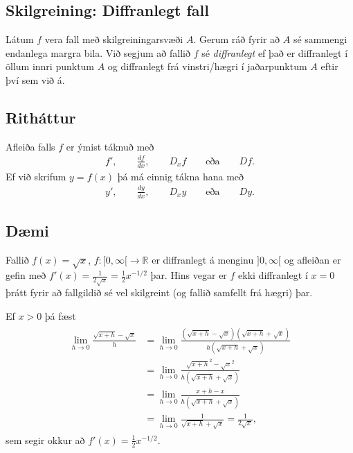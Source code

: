 \documentclass[b5paper,11pt,icelandic]{sphinxmanual}
\begin{document}

\subsection{Skilgreining: Diffranlegt fall}
\label{kafli03:skilgreining-diffranlegt-fall}\label{kafli03:index-3}
Látum \(f\) vera fall með skilgreiningarsvæði \(A\). Gerum ráð
fyrir að \(A\) sé sammengi endanlega margra bila. Við segjum að
fallið \(f\) sé \emph{diffranlegt} ef það er diffranlegt í öllum innri
punktum \(A\) og diffranlegt frá vinstri/hægri í jaðarpunktum
\(A\) eftir því sem við á.


\subsection{Ritháttur}
\label{kafli03:rithattur}
Afleiða falls \(f\) er ýmist táknuð með
\begin{equation*}
\begin{split}f', \qquad \frac {df}{dx}, \qquad D_x f \qquad \text{eða} \qquad Df.\end{split}
\end{equation*}
Ef við skrifum \(y=f(x)\) þá má einnig tákna hana með
\begin{equation*}
\begin{split}y', \qquad \frac {dy}{dx}, \qquad D_x y \qquad \text{eða} \qquad Dy.\end{split}
\end{equation*}

\subsection{Dæmi}
\label{kafli03:id3}
Fallið \(f(x) = \sqrt{x}\), \(f:[0,\infty[\to {{\mathbb  R}}\)
er diffranlegt á menginu \(]0,\infty[\) og afleiðan er gefin með
\(f'(x) = \frac 1{2\sqrt{x}} = \frac 12 x^{-1/2}\) þar. Hins vegar
er \(f\) ekki diffranlegt í \(x=0\) þrátt fyrir að fallgildið sé
vel skilgreint (og fallið samfellt frá hægri) þar.

Ef \(x>0\) þá fæst
\begin{equation*}
\begin{split}\begin{aligned}
  \lim_{h\to 0} \frac{\sqrt{x+h}-\sqrt{x}}h &=
  \lim_{h\to 0} \frac{(\sqrt{x+h}-\sqrt{x})(\sqrt{x+h}+\sqrt{x})}{h(\sqrt{x+h}+\sqrt{x})}\\
  &= \lim_{h\to 0} \frac{\sqrt{x+h}^2-\sqrt{x}^2}{h(\sqrt{x+h}+\sqrt{x})}\\
  &= \lim_{h\to 0} \frac{x+h-x}{h(\sqrt{x+h}+\sqrt{x})}\\
  &= \lim_{h\to 0} \frac{1}{\sqrt{x+h}+\sqrt{x}} = \frac{1}{2\sqrt{x}},\end{aligned}\end{split}
\end{equation*}
sem segir okkur að \(f'(x) = \frac 12 x^{-1/2}\).
\end{document}

